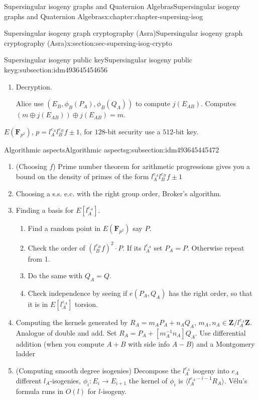 \documentclass[oneside,10pt,]{book}
\numberwithin{equation}{section}
\newcommand{\inv}{^{-1}}
\newcommand{\lb}{[}
\newcommand{\rb}{]}
\newcommand{\ZZ}{\mathbf{Z}}
\newcommand{\FF}{\mathbf{F}}
\begin{document}
\begin{chapterptx}{Supersingular isogeny graphs and Quaternion Algebras}{}{Supersingular isogeny graphs and Quaternion Algebras}{}{}{x:chapter:chapter-supersing-isog}
\begin{sectionptx}{Supersingular isogeny graph cryptography (Asra)}{}{Supersingular isogeny graph cryptography (Asra)}{}{}{x:section:sec-supersing-isog-crypto}
\begin{subsectionptx}{Supersingular isogeny public key}{}{Supersingular isogeny public key}{}{}{g:subsection:idm493645454656}
\begin{enumerate}
\par
Send Alice \(c = (E_B, \phi_B(P_A), \phi_B(Q_A), m\oplus j(E_{AB}))\)%
\item{}Decryption.%
\par
Alice use \((E_B, \phi_B(P_A), \phi_B(Q_A))\) to compute \(j(E_{AB})\). Computes \((m\oplus j(E_{AB})) \oplus j(E_{AB}) = m\).%
\end{enumerate}
%
\par
\(E(\FF_{p^2})\), \(p = l_A^{e_A} l_B^{e_B} f \pm 1\), for \(128\)-bit security use a \(512\)-bit key.%
\end{subsectionptx}
%
%
\typeout{************************************************}
\typeout{************************************************}
%
\begin{subsectionptx}{Algorithmic aspects}{}{Algorithmic aspects}{}{}{g:subsection:idm493645445472}
%
\begin{enumerate}
\item{}(Choosing \(f\)) Prime number theorem for arithmetic progressions gives you a bound on the density of primes of the form \(l_A^{e_A} l_B^{e_B} f \pm 1\)%
\item{}Choosing a s.s. e.c. with the right group order, Broker's algorithm.%
\item{}Finding a basis for \(E\lb l_A^{e_A}\rb\).%
\begin{enumerate}
\item{}Find a random point in \(E(\FF_{p^2})\) say \(P\).%
\item{}Check the order of \((l_B^{e_B} f)^2 \cdot P\). If its \(l_A^{e_A}\) set \(P_A = P\). Otherwise repeat from 1.%
\item{}Do the same with \(Q_A = Q\).%
\item{}Check independence by seeing if \(e(P_A,Q_A) \) has the right order, so that it is in \(E\lb l_A^{e_A} \rb\) torsion.%
\end{enumerate}
%
\item{}Computing the kernels generated by \(R_A = m_A P_A + n_A Q_A\), \(m_A, n_A \in \ZZ/l_A^{e_A} \ZZ\). Analogue of double and add. Set \(R_A = P_A + \lb m_A\inv n_A\rb Q_A\). Use differential addition (when you compute \(A+B\) with side info \(A-B\)) and a Montgomery ladder%
\item{}(Computing smooth degree isogenies) Decompose the \(l_A^{e_A}\) isogeny into \(e_A\) different \(l_A\)-isogenies, \(\phi_i\colon E_i \to E_{i+1}\) the kernel of \(\phi_i\) is \(\langle l_A^{e_A - i - 1} R_A\rangle\). Vélu's formula runs in \(O(l)\) for \(l\)-isogeny.%

\end{enumerate}
\end{subsectionptx}
\end{sectionptx}
\end{chapterptx}
\end{document}
